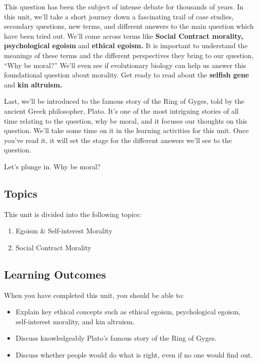 \documentclass[
]{book}
\providecommand{\tightlist}{%
  \setlength{\itemsep}{0pt}\setlength{\parskip}{0pt}}
\begin{document}
This question has been the subject of intense debate for thousands of years. In this unit, we'll take a short journey down a fascinating trail of case studies, secondary questions, new terms, and different answers to the main question which have been tried out. We'll come across terms like \textbf{Social Contract morality, psychological egoism} and \textbf{ethical egoism.} It is important to understand the meanings of these terms and the different perspectives they bring to our question, ``Why be moral?'' We'll even see if evolutionary biology can help us answer this foundational question about morality. Get ready to read about the \textbf{selfish gene} and \textbf{kin altruism.}

Last, we'll be introduced to the famous story of the Ring of Gyges, told by the ancient Greek philosopher, Plato. It's one of the most intriguing stories of all time relating to the question, why be moral, and it focuses our thoughts on this question. We'll take some time on it in the learning activities for this unit. Once you've read it, it will set the stage for the different answers we'll see to the question.

Let's plunge in. Why be moral?

\hypertarget{topics-1}{%
\subsection*{Topics}\label{topics-1}}

This unit is divided into the following topics:

\begin{enumerate}
\def\labelenumi{\arabic{enumi}.}
\tightlist
\item
  Egoism \& Self-interest Morality
\item
  Social Contract Morality
\end{enumerate}

\hypertarget{learning-outcomes-1}{%
\subsection*{Learning Outcomes}\label{learning-outcomes-1}}

When you have completed this unit, you should be able to:

\begin{itemize}
\tightlist
\item
  Explain key ethical concepts such as ethical egoism, psychological egoism, self-interest morality, and kin altruism.
\item
  Discuss knowledgeably Plato's famous story of the Ring of Gyges.
\item
  Discuss whether people would do what is right, even if no one would find out.
\end{itemize}
\end{document}
